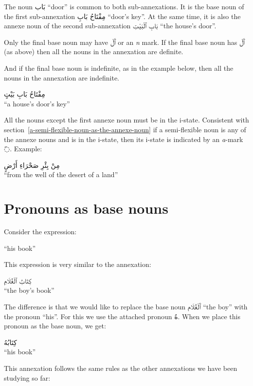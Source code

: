 \documentclass[
  10pt,
]{book}
\begin{document}
The noun \foreignlanguage{arabic}{بَاب} \enquote{door} is common to both sub-annexations. It is the base noun of the first sub-annexation
\foreignlanguage{arabic}{مِفْتَاحُ بَابِ} \enquote{door's key}.
At the same time, it is also the annexe noun of the second sub-annexation
\foreignlanguage{arabic}{بَابِ ٱلْبَيْتِ} \enquote{the house's door}.

Only the final base noun may have \foreignlanguage{arabic}{ٱَلْ} or an \emph{n} mark. If the final base noun has \foreignlanguage{arabic}{ٱَلْ} (as above) then all the nouns in the annexation are definite.

And if the final base noun is indefinite, as in the example below, then all the nouns in the annexation are indefinite.

\foreignlanguage{arabic}{مِفْتَاحُ بَابِ بَيْتٍ}\\
\enquote{a house's door's key}

All the nouns except the first annexe noun must be in the i-state. Consistent with
section~\ref{a-semi-flexible-noun-as-the-annexe-noun}
if a semi-flexible noun is any of the annexe nouns and is in the i-state, then its i-state is indicated by an \emph{a}-mark \foreignlanguage{arabic}{◌َ}. Example:

\foreignlanguage{arabic}{مِنْ بِئْرِ صَحْرَاءِ أَرْضٍ}\\
\enquote{from the well of the desert of a land}

\section{Pronouns as base nouns}\label{pronouns-as-base-nouns}

Consider the expression:

\enquote{his book}

This expression is very similar to the annexation:

\foreignlanguage{arabic}{کِتَابُ ٱلْغُلَامِ}\\
\enquote{the boy's book}

The difference is that we would like to replace the base noun \foreignlanguage{arabic}{ٱَلْغُلَام} \enquote{the boy} with the pronoun \enquote{his}. For this we use the attached pronoun \foreignlanguage{arabic}{هُ}. When we place this pronoun as the base noun, we get:

\foreignlanguage{arabic}{کِتَابُهُ}\\
\enquote{his book}

This annexation follows the same rules as the other annexations we have been studying so far:
\end{document}
